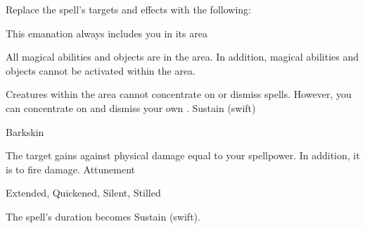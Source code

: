 Replace the spell's targets and effects with the following:
\begin{spellcontent}
\begin{augmenttargetinginfo}
\spellspecial This emanation always includes you in its area
\end{augmenttargetinginfo}
\begin{augmenteffects}
\spelleffect
All magical abilities and objects are  in the area.
In addition, magical abilities and objects cannot be activated within the area.
\par Creatures within the area cannot concentrate on or dismiss spells. However, you can concentrate on and dismiss your own .
\spelldur Sustain (swift)
\end{augmenteffects}
\end{spellcontent}
\begin{spellsection}{Barkskin}
\begin{spellheader}
\end{spellheader}
\begin{spellcontent}
\begin{spelltargetinginfo}
\end{spelltargetinginfo}
\begin{spelleffects}
\spelleffect
The target gains  against physical damage equal to your spellpower.
In addition, it is  to fire damage.
\spelldur Attunement
\end{spelleffects}
\end{spellcontent}
\begin{spellfooter}
 Extended, Quickened, Silent, Stilled
\end{spellfooter}
\begin{spellsubcontent}
\begin{spellcantrip}
The spell's duration becomes Sustain (swift).
\end{spellcantrip}
\end{spellsubcontent}
\end{spellsection}
